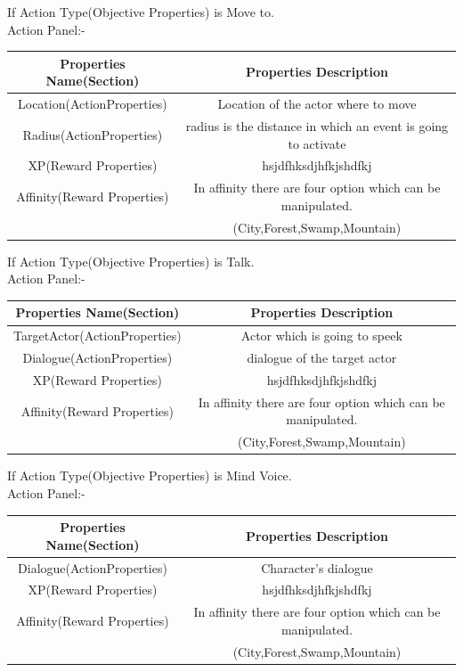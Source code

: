 \documentclass[12pt]{article}
\begin{document}
	  If Action Type(Objective Properties) is Move to.\\
	  Action Panel:-
	  \begin{center}
	  	\begin{tabular}{|c|c|}\hline
	  	Properties Name(Section)& Properties Description\\\hline\hline
	  	Location(ActionProperties) & Location of the actor where to move\\\hline
	  	Radius(ActionProperties) & radius is the distance in which an event is going to activate\\\hline
	  		  	XP(Reward Properties)& hsjdfhksdjhfkjshdfkj\\\hline
	  	Affinity(Reward Properties)& In affinity there are four option which can be manipulated.\\
	  	& (City,Forest,Swamp,Mountain)\\\hline
	  	\end{tabular}
	  \end{center}
	  \pagebreak
	    If Action Type(Objective Properties) is Talk.\\
	  Action Panel:-
	  \begin{center}
	  	\begin{tabular}{|c|c|}\hline
	  	Properties Name(Section)& Properties Description\\\hline\hline
	  	TargetActor(ActionProperties) & Actor which is going to speek\\\hline
	  	Dialogue(ActionProperties) & dialogue of the target actor\\\hline
	  		  	XP(Reward Properties)& hsjdfhksdjhfkjshdfkj\\\hline
	  	Affinity(Reward Properties)& In affinity there are four option which can be manipulated.\\
	  	& (City,Forest,Swamp,Mountain)\\\hline
	  	\end{tabular}
	  \end{center}
	    If Action Type(Objective Properties) is Mind Voice.\\
	  Action Panel:-
	  \begin{center}
	  	\begin{tabular}{|c|c|}\hline
	  	Properties Name(Section)& Properties Description\\\hline\hline
	  	Dialogue(ActionProperties) & Character's dialogue\\\hline
	  		  	XP(Reward Properties)& hsjdfhksdjhfkjshdfkj\\\hline
	  	Affinity(Reward Properties)& In affinity there are four option which can be manipulated.\\
	  	& (City,Forest,Swamp,Mountain)\\\hline
	  	\end{tabular}
	  \end{center}
\end{document}
